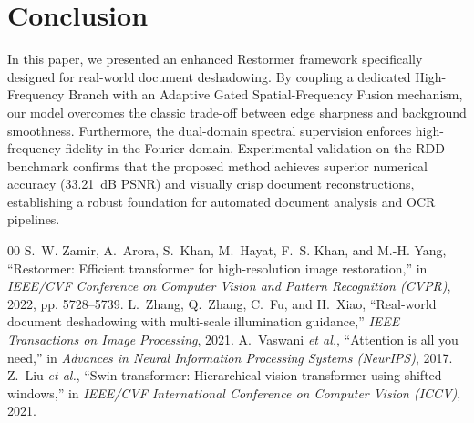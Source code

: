 \documentclass[conference]{IEEEtran}
\begin{document}
\section{Conclusion}
In this paper, we presented an enhanced Restormer framework specifically designed for real-world document deshadowing. By coupling a dedicated High-Frequency Branch with an Adaptive Gated Spatial-Frequency Fusion mechanism, our model overcomes the classic trade-off between edge sharpness and background smoothness. Furthermore, the dual-domain spectral supervision enforces high-frequency fidelity in the Fourier domain. Experimental validation on the RDD benchmark confirms that the proposed method achieves superior numerical accuracy (33.21~dB PSNR) and visually crisp document reconstructions, establishing a robust foundation for automated document analysis and OCR pipelines.


\begin{thebibliography}{00}
 S.~W. Zamir, A.~Arora, S.~Khan, M.~Hayat, F.~S. Khan, and M.-H. Yang, ``Restormer: Efficient transformer for high-resolution image restoration,'' in \emph{IEEE/CVF Conference on Computer Vision and Pattern Recognition (CVPR)}, 2022, pp. 5728--5739.
 L.~Zhang, Q.~Zhang, C.~Fu, and H.~Xiao, ``Real-world document deshadowing with multi-scale illumination guidance,'' \emph{IEEE Transactions on Image Processing}, 2021.
 A.~Vaswani \emph{et al.}, ``Attention is all you need,'' in \emph{Advances in Neural Information Processing Systems (NeurIPS)}, 2017.
 Z.~Liu \emph{et al.}, ``Swin transformer: Hierarchical vision transformer using shifted windows,'' in \emph{IEEE/CVF International Conference on Computer Vision (ICCV)}, 2021.
\end{thebibliography}
\end{document}
